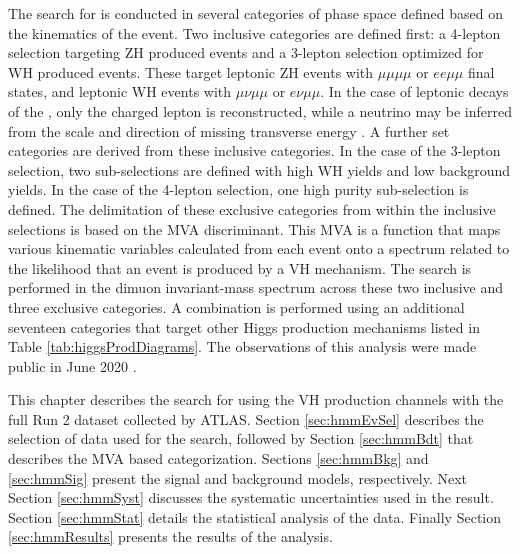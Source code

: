 The search for \hmm is conducted in several categories of phase space defined based on the kinematics of the event.
Two inclusive categories are defined first: a 4-lepton selection targeting ZH produced events and a 3-lepton selection optimized for WH produced events.
These target leptonic ZH events with $\mu\mu\mu\mu$ or $ee\mu\mu$ final states, and leptonic WH events with $\mu\nu\mu\mu$ or $e\nu\mu\mu$.
In the case of leptonic decays of the \W, only the charged lepton is reconstructed, while a neutrino may be inferred from the scale and direction of missing transverse energy \met.
A further set categories are derived from these inclusive categories.
In the case of the 3-lepton selection, two sub-selections are defined with high WH yields and low background yields.
In the case of the 4-lepton selection, one high purity sub-selection is defined.
The delimitation of these exclusive categories from within the inclusive selections is based on the MVA discriminant.
This MVA is a function that maps various kinematic variables calculated from each event onto a spectrum related to the likelihood that an event is produced by a VH mechanism. 
The search is performed in the dimuon invariant-mass spectrum across these two inclusive and three exclusive categories.
A combination is performed using an additional seventeen categories that target other Higgs production mechanisms listed in Table \ref{tab:higgsProdDiagrams}.
The observations of this analysis were made public in June 2020 \cite{atlasHmm}.

This chapter describes the search for \hmm using the VH production channels with the full Run 2 dataset collected by ATLAS.
Section \ref{sec:hmmEvSel} describes the selection of data used for the search, followed by Section \ref{sec:hmmBdt} that describes the MVA based categorization.
Sections \ref{sec:hmmBkg} and \ref{sec:hmmSig} present the signal and background models, respectively.
Next Section \ref{sec:hmmSyst} discusses the systematic uncertainties used in the result.
Section \ref{sec:hmmStat} details the statistical analysis of the data.
Finally Section \ref{sec:hmmResults} presents the results of the analysis.








